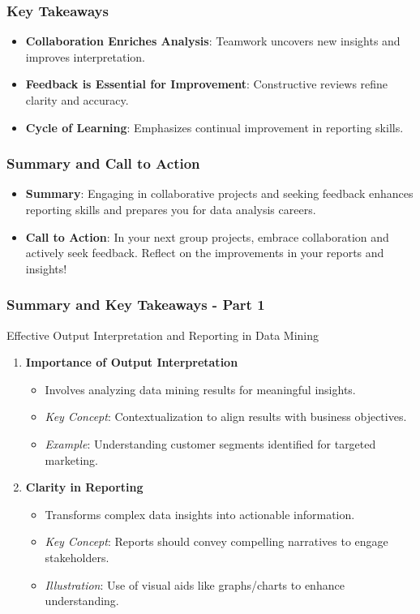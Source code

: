 \documentclass{beamer}
\begin{document}
\begin{frame}[fragile]
    \frametitle{Key Takeaways}
    \begin{itemize}
        \item \textbf{Collaboration Enriches Analysis}: Teamwork uncovers new insights and improves interpretation.
        \item \textbf{Feedback is Essential for Improvement}: Constructive reviews refine clarity and accuracy.
        \item \textbf{Cycle of Learning}: Emphasizes continual improvement in reporting skills.
    \end{itemize}
\end{frame}

\begin{frame}[fragile]
    \frametitle{Summary and Call to Action}
    \begin{itemize}
        \item \textbf{Summary}: Engaging in collaborative projects and seeking feedback enhances reporting skills and prepares you for data analysis careers.
        \item \textbf{Call to Action}: In your next group projects, embrace collaboration and actively seek feedback. Reflect on the improvements in your reports and insights!
    \end{itemize}
\end{frame}

\begin{frame}[fragile]
    \frametitle{Summary and Key Takeaways - Part 1}
    
    \begin{block}{Effective Output Interpretation and Reporting in Data Mining}
        \begin{enumerate}
            \item \textbf{Importance of Output Interpretation}
            \begin{itemize}
                \item Involves analyzing data mining results for meaningful insights.
                \item \textit{Key Concept}: Contextualization to align results with business objectives.
                \item \textit{Example}: Understanding customer segments identified for targeted marketing.
            \end{itemize}

            \item \textbf{Clarity in Reporting}
            \begin{itemize}
                \item Transforms complex data insights into actionable information.
                \item \textit{Key Concept}: Reports should convey compelling narratives to engage stakeholders.
                \item \textit{Illustration}: Use of visual aids like graphs/charts to enhance understanding.
            \end{itemize}
        \end{enumerate}
    \end{block}
\end{frame}
\end{document}
